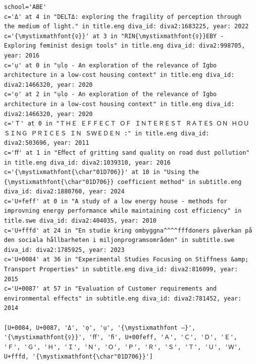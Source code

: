 \documentclass[12pt, twoside]{article}
\begin{document}
\begin{lstlisting}[style=latexExampleForAuthors, 
caption={Part of the output about characters missing from Figtree that were used in \gls{DiVA} in English and Swedish titles and subtitles - for the ABE school. Note that not all of the characters can be shown in the font used in this document. However, they can be seen in the output when you run the notebook. Here, these characters have been manually edited to use another font where the character exists.},
label=lst:missingFigtreeABE]
\end{lstlisting}
\begin{Verbatim}[breaklines=true, commandchars=\\\{\}]
school='ABE'
c='Δ' at 4 in "DELTΔ: exploring the fragility of perception through the medium of light." in title.eng diva_id: diva2:1683225, year: 2022
c='{\mystixmathfont{♀}}' at 3 in "RIN{\mystixmathfont{♀}}EBY - Exploring feminist design tools" in title.eng diva_id: diva2:998705, year: 2016
c='ụ' at 0 in "ụlọ - An exploration of the relevance of Igbo architecture in a low-cost housing context" in title.eng diva_id: diva2:1466320, year: 2020
c='ọ' at 2 in "ụlọ - An exploration of the relevance of Igbo architecture in a low-cost housing context" in title.eng diva_id: diva2:1466320, year: 2020
c='Ｔ' at 0 in "ＴＨＥ ＥＦＦＥＣＴ ＯＦ ＩＮＴＥＲＥＳＴ ＲＡＴＥS ＯＮ ＨＯＵＳＩＮＧ ＰＲＩＣＥＳ ＩＮ ＳＷＥＤＥＮ :" in title.eng diva_id: diva2:503696, year: 2011
c='ﬀ' at 1 in "Eﬀect of gritting sand quality on road dust pollution" in title.eng diva_id: diva2:1039310, year: 2016
c='{\mystixmathfont{\char"01D706}}' at 10 in "Using the {\mystixmathfont{\char"01D706}} coefficient method" in subtitle.eng diva_id: diva2:1880760, year: 2024
c='U+feff' at 0 in "﻿﻿﻿A study of a low energy house - methods for improvning energy performance while maintaining cost efficiency" in title.swe diva_id: diva2:404035, year: 2010
c='U+fffd' at 24 in "En studie kring ombyggna^^^^fffdoners påverkan på den sociala hållbarheten i miljonprogramsområden" in subtitle.swe diva_id: diva2:1785925, year: 2023
c='U+0084' at 36 in "Experimental Studies Focusing on Stiffness &amp; Transport Properties" in subtitle.eng diva_id: diva2:816099, year: 2015
c='U+0087' at 57 in "Evaluation of Customer requirements and environmental effects" in subtitle.eng diva_id: diva2:781452, year: 2014

[U+0084, U+0087, 'Δ', 'ọ', 'ụ', '{\mystixmathfont ―}', '{\mystixmathfont{♀}}', 'ﬀ', 'ﬁ', U+00feff, 'Ａ', 'Ｃ', 'Ｄ', 'Ｅ', 'Ｆ', 'Ｇ', 'Ｈ', 'Ｉ', 'Ｎ', 'Ｏ', 'Ｐ', 'Ｒ', 'Ｓ', 'Ｔ', 'Ｕ', 'Ｗ',  U+fffd, '{\mystixmathfont{\char"01D706}}']
\end{Verbatim}
\FloatBarrier
\end{document}
